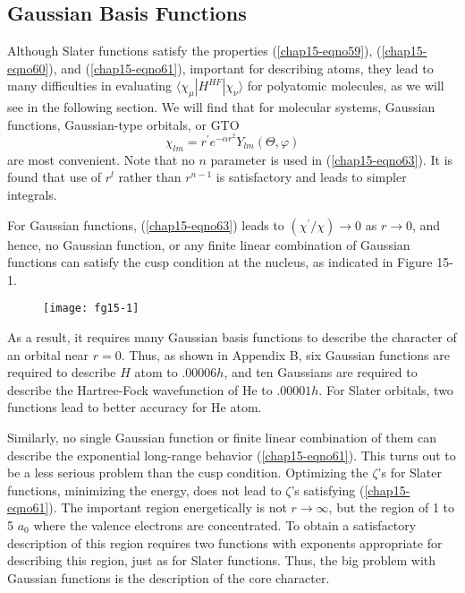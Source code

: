 \subsection{Gaussian Basis Functions}

Although Slater functions satisfy the properties
(\ref{chap15-eqno59}), (\ref{chap15-eqno60}), and
(\ref{chap15-eqno61}), important for describing atoms, they lead to
many difficulties in evaluating $\langle
\chi_{\mu}|H^{HF}|\chi_{\nu}\rangle$ for polyatomic molecules, as we
will see in the following section.  We will find that for molecular
systems, Gaussian functions, Gaussian-type orbitals, or GTO
\begin{equation}
\chi_{lm} = r^{\prime}e^{-\alpha r^2} Y_{lm} ( \Theta , 
\varphi )
\label{chap15-eqno63}
\end{equation}
are most convenient.  Note that no $n$ parameter is used in
(\ref{chap15-eqno63}).  It is found that use of $r^l$ rather than
$r^{n-1}$ is satisfactory and leads to simpler integrals.

For Gaussian functions, (\ref{chap15-eqno63}) leads to
$(\chi^{\prime}/ \chi)\rightarrow 0$ as $r \rightarrow 0$, and hence,
no Gaussian function, or any finite linear combination of Gaussian
functions can satisfy the cusp condition at the nucleus, as indicated
in Figure 15-1.

\begin{figure}
\texttt{[image: fg15-1]}
\caption{}
\label{chap15-fig1}
\end{figure}

As a result, it requires many Gaussian basis functions to describe the
character of an orbital near $r = 0$.  Thus, as shown in Appendix B, six
Gaussian functions are required to describe $H$ atom to $.00006 h$, and ten
Gaussians are required to describe the Hartree-Fock wavefunction of He to
$.00001 h$.  For Slater orbitals, two functions lead to better accuracy for He
atom.

Similarly, no single Gaussian function or finite linear combination of
them can describe the exponential long-range behavior
(\ref{chap15-eqno61}). This turns out to be a less serious problem
than the cusp condition. Optimizing the $\zeta$'s for Slater
functions, minimizing the energy, does not lead to $\zeta$'s
satisfying (\ref{chap15-eqno61}).  The important region energetically
is not $r
\rightarrow \infty$, but the region of 1 to 5 $a_0$ where the valence
electrons are concentrated.  To obtain a satisfactory description of
this region requires two functions with exponents appropriate for
describing this region, just as for Slater functions. Thus, the big
problem with Gaussian functions is the description of the core
character.

